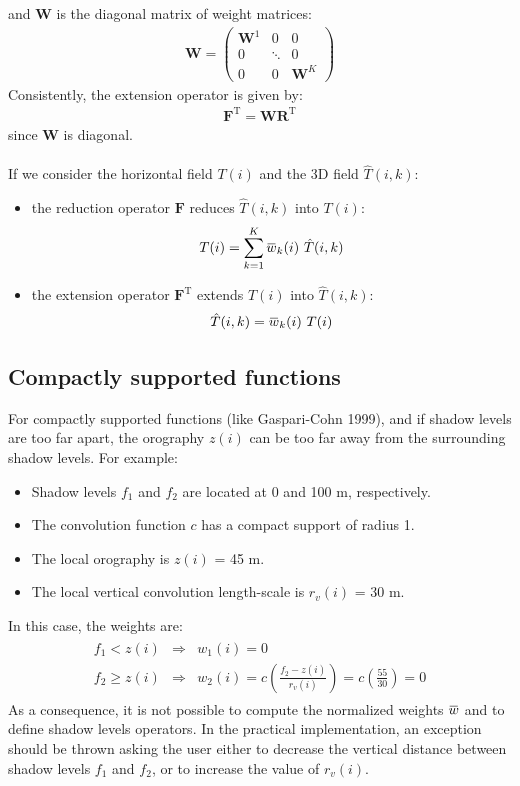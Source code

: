 \documentclass[12pt]{scrartcl}
\newcommand{\overbar}[1]{\mkern 1.5mu\overline{\mkern-1.5mu#1\mkern-1.5mu}\mkern 1.5mu}
\begin{document}
and $\mathbf{W}$ is the diagonal matrix of weight matrices:
\begin{align}
\mathbf{W} = \left(\begin{array}{ccc}
\mathbf{W}^1 & 0 & 0 \\
0 & \ddots & 0 \\
0 & 0 & \mathbf{W}^K
\end{array}\right)
\end{align}
Consistently, the extension operator is given by:
\begin{align}
\mathbf{F}^\text{T} = \mathbf{W} \mathbf{R}^\text{T}
\end{align}
since $\mathbf{W}$ is diagonal.\\
$  $\\
If we consider the horizontal field $T(i)$ and the 3D field $\hat{T}(i,k)$:
\begin{itemize}
\item the reduction operator $\mathbf{F}$ reduces $\hat{T}(i,k)$ into $T(i)$:
\begin{align}
T(i) = \sum_{k=1}^K \overbar{w}_k(i) \ \hat{T}(i,k)
\end{align}
\item the extension operator $\mathbf{F}^\text{T}$ extends $T(i)$ into $\hat{T}(i,k)$:
\begin{align}
\hat{T}(i,k) = \overbar{w}_k(i) \ T(i)
\end{align}
\end{itemize}

\subsection{Compactly supported functions}
For compactly supported functions (like Gaspari-Cohn 1999), and if shadow levels are too far apart, the orography $z(i)$ can be too far away from the surrounding shadow levels. For example:
\begin{itemize}
\item Shadow levels $f_1$ and $f_2$ are located at 0 and 100 m, respectively.
\item The convolution function $c$ has a compact support of radius 1.
\item The local orography is $z(i)$ = 45 m.
\item The local vertical convolution length-scale is $r_v(i)$ = 30 m.
\end{itemize}
In this case, the weights are:
\begin{align*}
\begin{array}{ccl}
f_1 < z(i)  & \Rightarrow & w_1(i) = 0 \\
f_2 \ge z(i) & \Rightarrow & w_2(i) = c\left(\displaystyle \frac{f_2 - z(i)}{r_v(i)}\right) = c\left(\frac{55}{30}\right) = 0
\end{array}
\end{align*}
As a consequence, it is not possible to compute the normalized weights $\overbar{w}$ and to define shadow levels operators. In the practical implementation, an exception should be thrown asking the user either to decrease the vertical distance between shadow levels $f_1$ and $f_2$, or to increase the value of $r_v(i)$.
\end{document}
